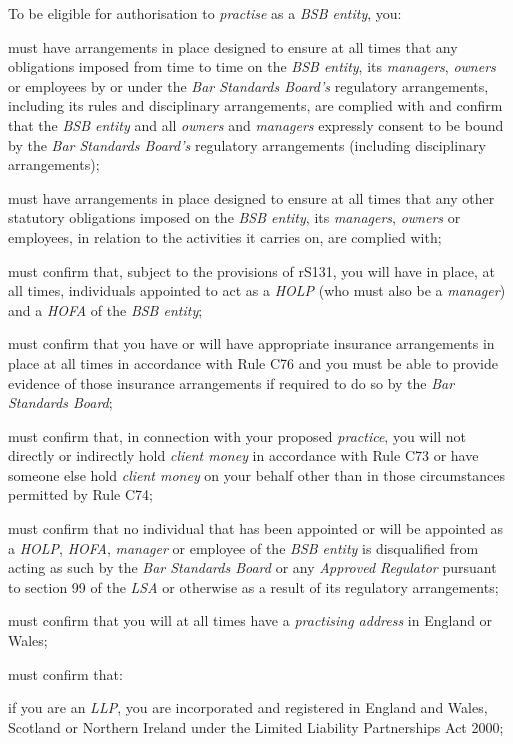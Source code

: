 To be eligible for authorisation to \emph{practise} as a \emph{BSB
entity}, you:\nl\item must have arrangements in place designed to ensure at all times that
any obligations imposed from time to time on the \emph{BSB entity}, its
\emph{managers}, \emph{owners} or employees by or under the \emph{Bar
Standards Board's} regulatory arrangements, including its rules and
disciplinary arrangements, are complied with and confirm that the
\emph{BSB entity} and all \emph{owners} and \emph{managers} expressly
consent to be bound by the \emph{Bar Standards Board's} regulatory
arrangements (including disciplinary arrangements);
\item must have arrangements in place designed to ensure at all times that
any other statutory obligations imposed on the \emph{BSB entity}, its
\emph{managers}, \emph{owners} or employees, in relation to the
activities it carries on, are complied with;
\item must confirm that, subject to the provisions of rS131, you will have
in place, at all times, individuals appointed to act as a \emph{HOLP}
(who must also be a \emph{manager}) and a \emph{HOFA} of the \emph{BSB
entity};
\item must confirm that you have or will have appropriate insurance
arrangements in place at all times in accordance with Rule C76 and you
must be able to provide evidence of those insurance arrangements if
required to do so by the \emph{Bar Standards Board};
\item must confirm that, in connection with your proposed \emph{practice},
you will not directly or indirectly hold \emph{client money} in
accordance with Rule C73 or have someone else hold \emph{client money}
on your behalf other than in those circumstances permitted by Rule C74;
\item must confirm that no individual that has been appointed or will be
appointed as a \emph{HOLP}, \emph{HOFA}, \emph{manager} or employee of
the \emph{BSB entity} is disqualified from acting as such by the
\emph{Bar Standards Board} or any \emph{Approved Regulator} pursuant to
section 99 of the \emph{LSA} or otherwise as a result of its regulatory
arrangements;
\item must confirm that you will at all times have a \emph{practising
address} in England or Wales;
\item must confirm that:
\al
\item if you are an \emph{LLP}, you are incorporated and registered in
England and Wales, Scotland or Northern Ireland under the Limited
Liability Partnerships Act 2000;

